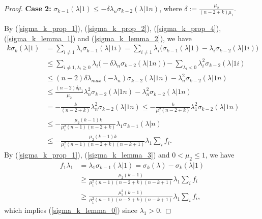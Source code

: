 \documentclass[12pt]{amsart}
\theoremstyle{definition}
\theoremstyle{remark}
\numberwithin{equation}{section}
\begin{document}
\begin{proof}
	{\bf Case 2:} $\sigma_{k-1}(\lambda|1) \leq - \delta \lambda_n \sigma_{k-2}(\lambda|1n)$, where $\delta := \frac{\mu_2}{(n-2+k)\mu_1}$.
	
	By (\ref{sigma_k_prop_1}), (\ref{sigma_k_prop_2}), (\ref{sigma_k_prop_4}), (\ref{sigma_k_lemma_1}) and (\ref{sigma_k_lemma_2}), we have
	\begin{equation}\label{sigma_k_lemma_3}
	\begin{aligned}
	k \sigma_k(\lambda|1) & = \sum_{i\neq 1} \lambda_i \sigma_{k-1}(\lambda|1i) 
	= \sum_{i\neq 1} \lambda_i \big(\sigma_{k-1}(\lambda|1) - \lambda_i \sigma_{k-2}(\lambda|1i)\big)\\
	&\leq  \sum_{i\neq 1, \lambda_i \geq 0} \lambda_i \big( - \delta \lambda_n \sigma_{k-2}(\lambda|1n) \big) - \sum_{\lambda_i < 0} \lambda_i^2 \sigma_{k-2}(\lambda|1i)\\
	&\leq (n-2) \delta \lambda_{max} (-\lambda_n) \sigma_{k-2}(\lambda|1n) - \lambda_n^2 \sigma_{k-2}(\lambda|1n)\\
	&\leq \frac{(n-2) \delta \mu_1}{\mu_2} \lambda_n^2 \sigma_{k-2}(\lambda|1n) - \lambda_n^2 \sigma_{k-2}(\lambda|1n)\\
	&= -\frac{k}{(n-2+k)} \lambda_n^2 \sigma_{k-2}(\lambda|1n)
	\leq -\frac{k}{\mu_1^2(n-2+k)} \lambda_1^2 \sigma_{k-2}(\lambda|1n)\\
	&\leq -\frac{\mu_2 (k-1)k}{\mu_1^2 (n-1)(n-2+k)} \lambda_1 \sigma_{k-1}(\lambda|n)\\
	&\leq -\frac{\mu_2 (k-1)k}{\mu_1^2 (n-1)(n-2+k)(n-k+1)} \lambda_1 \sum_i f_i.
	\end{aligned}
	\end{equation}
	By (\ref{sigma_k_prop_1}), (\ref{sigma_k_lemma_3}) and $0<\mu_2 \leq 1$, we have
	\begin{equation}\begin{aligned}
	f_1 \lambda_1 &= \lambda_1 \sigma_{k-1}(\lambda|1) = \sigma_k(\lambda) - \sigma_{k}(\lambda|1)\\
	&\geq \frac{\mu_2 (k-1)}{\mu_1^2 (n-1)(n-2+k)(n-k+1)} \lambda_1 \sum_i f_i \\
	&\geq \frac{\mu_2^2 (k-1)}{\mu_1^2 (n-1)(n-2+k)(n-k+1)} \lambda_1 \sum_i f_i,
	\end{aligned}
	\end{equation}
	which implies (\ref{sigma_k_lemma_0}) since $\lambda_1 > 0$.
\end{proof}
\end{document}
